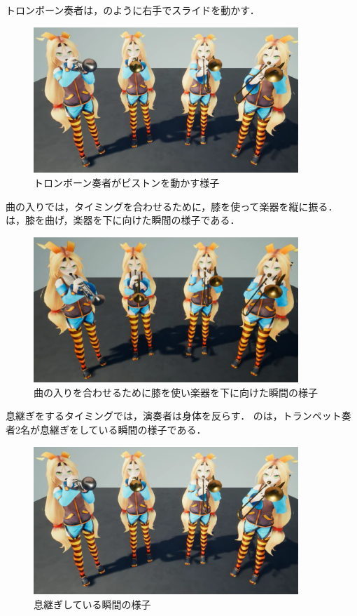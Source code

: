 トロンボーン奏者は，のように右手でスライドを動かす．
\begin{figure}[h]
	\centering
	\includegraphics[width=10cm]{fig/chap4/anim2_slide.eps}
	\caption{トロンボーン奏者がピストンを動かす様子}
	\label{fig:anim2_zoom}
\end{figure}
曲の入りでは，タイミングを合わせるために，膝を使って楽器を縦に振る．
は，膝を曲げ，楽器を下に向けた瞬間の様子である．
\begin{figure}[h]
	\centering
	\includegraphics[width=10cm]{fig/chap4/anim2_down.eps}
	\caption{曲の入りを合わせるために膝を使い楽器を下に向けた瞬間の様子}
	\label{fig:anim2_down}
\end{figure}
息継ぎをするタイミングでは，演奏者は身体を反らす．
のは，トランペット奏者2名が息継ぎをしている瞬間の様子である．
\begin{figure}[h]
	\centering
	\includegraphics[width=10cm]{fig/chap4/anim2_breath.eps}
	\caption{息継ぎしている瞬間の様子}
	\label{fig:anim2_breath}
\end{figure}

